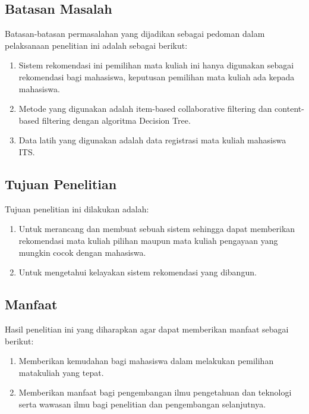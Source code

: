 \subsection{Batasan Masalah}
Batasan-batasan permasalahan yang dijadikan sebagai pedoman dalam pelaksanaan penelitian ini adalah sebagai berikut:
\begin{enumerate}[noitemsep]
      \item Sistem rekomendasi ini pemilihan mata kuliah
            ini hanya digunakan sebagai rekomendasi bagi
            mahasiswa, keputusan pemilihan mata kuliah
            ada kepada mahasiswa.
      \item Metode yang digunakan adalah item-based
            collaborative filtering dan content-based
            filtering dengan algoritma Decision Tree.
      \item Data latih yang digunakan adalah data registrasi mata kuliah mahasiswa ITS.
\end{enumerate}

\subsection{Tujuan Penelitian}
Tujuan penelitian ini dilakukan adalah:
\begin{enumerate}[noitemsep]
      \item Untuk merancang dan membuat sebuah sistem sehingga dapat memberikan rekomendasi mata kuliah pilihan
            maupun mata kuliah pengayaan yang mungkin cocok dengan mahasiswa.
      \item Untuk
            mengetahui kelayakan sistem rekomendasi yang dibangun.
\end{enumerate}

\subsection{Manfaat}
Hasil penelitian ini yang diharapkan agar dapat memberikan manfaat sebagai berikut:
\begin{enumerate}[noitemsep]
      \item Memberikan kemudahan bagi mahasiswa dalam melakukan pemilihan matakuliah yang tepat.
      \item Memberikan manfaat bagi pengembangan ilmu pengetahuan dan teknologi serta wawasan ilmu bagi
            penelitian dan pengembangan selanjutnya.
\end{enumerate}